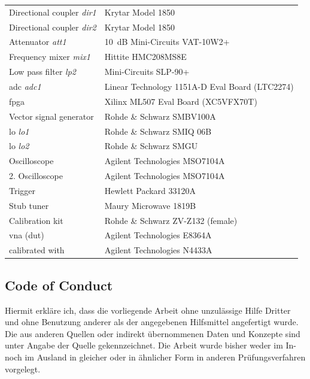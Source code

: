 \documentclass[12pt,a4paper,parskip=full,abstract=true,BCOR=12mm]{scrreprt}
\def\device#1{\mbox{\textit{#1}}}
\begin{document}
\begin{longtable}{ll}
    Directional coupler \device{dir1} & Krytar Model 1850\\
    Directional coupler \device{dir2} & Krytar Model 1850\\
    Attenuator \device{att1}          & \SI{10}{\deci\bel} Mini-Circuits VAT-10W2+\\
    Frequency mixer \device{mix1}     & Hittite HMC208MS8E \\
    Low pass filter \device{lp2}      & Mini-Circuits SLP-90+\\
    \gls{adc} \device{adc1}           & Linear Technology 1151A-D Eval Board (LTC2274) \\
    \gls{fpga}                        & Xilinx ML507 Eval Board (XC5VFX70T) \\
    Vector signal generator           & Rohde \& Schwarz SMBV100A \\
    \gls{lo} \device{lo1}             & Rohde \& Schwarz SMIQ 06B \\
    \gls{lo} \device{lo2}             & Rohde \& Schwarz SMGU \\
    Oscilloscope                      & Agilent Technologies MSO7104A \\
    2. Oscilloscope                   & Agilent Technologies MSO7104A \\
    Trigger                           & Hewlett Packard 33120A \\
    Stub tuner                        & Maury Microwave 1819B \\
    Calibration kit                   & Rohde \& Schwarz ZV-Z132 (female) \\
    \gls{vna} (\gls{dut})             & Agilent Technologies E8364A\\
    \hspace{2em} calibrated with      & Agilent Technologies N4433A\\
\end{longtable}




\begin{otherlanguage}{ngerman}
    \chapter*{Code of Conduct}
    Hiermit erkl\"are ich, dass die vorliegende Arbeit ohne unzul\"assige Hilfe Dritter und ohne Benutzung
    anderer als der angegebenen Hilfsmittel angefertigt wurde. Die aus anderen Quellen oder indirekt
    \"ubernommenen Daten und Konzepte sind unter Angabe der Quelle gekennzeichnet.
    Die Arbeit wurde bisher weder im In- noch im Ausland in gleicher oder in \"ahnlicher Form in anderen
    Pr\"ufungsverfahren vorgelegt.

    \par\noindent\makebox[7cm]{\hrulefill}      \hfill\makebox[5cm]{\hrulefill}%
    \par\noindent{} \hfill{}%
\end{otherlanguage}
\end{document}
